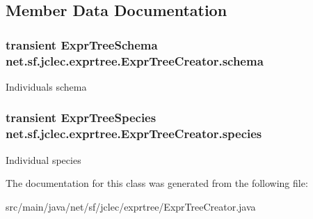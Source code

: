 \subsection{Member Data Documentation}
\hypertarget{classnet_1_1sf_1_1jclec_1_1exprtree_1_1_expr_tree_creator_af48de82c56c6d19eae9dd03d871cc7b1}{
\subsubsection[{schema}]{\setlength{\rightskip}{0pt plus 5cm}transient {\bf Expr\-Tree\-Schema} net.\-sf.\-jclec.\-exprtree.\-Expr\-Tree\-Creator.\-schema\hspace{0.3cm}{\ttfamily [protected]}}}\label{classnet_1_1sf_1_1jclec_1_1exprtree_1_1_expr_tree_creator_af48de82c56c6d19eae9dd03d871cc7b1}
Individuals schema \hypertarget{classnet_1_1sf_1_1jclec_1_1exprtree_1_1_expr_tree_creator_aa789d23c2a90bcb9a8e964f672f05c1b}{
\subsubsection[{species}]{\setlength{\rightskip}{0pt plus 5cm}transient {\bf Expr\-Tree\-Species} net.\-sf.\-jclec.\-exprtree.\-Expr\-Tree\-Creator.\-species\hspace{0.3cm}{\ttfamily [protected]}}}\label{classnet_1_1sf_1_1jclec_1_1exprtree_1_1_expr_tree_creator_aa789d23c2a90bcb9a8e964f672f05c1b}
Individual species 

The documentation for this class was generated from the following file\-:\begin{DoxyCompactItemize}
\item 
src/main/java/net/sf/jclec/exprtree/Expr\-Tree\-Creator.\-java\end{DoxyCompactItemize}
